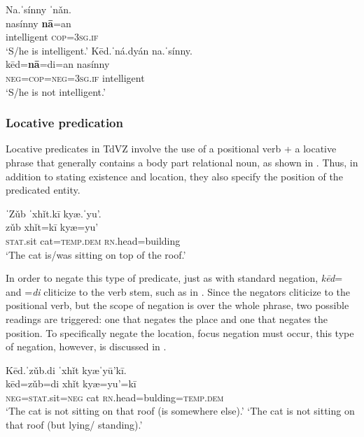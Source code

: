 \documentclass[output=paper,colorlinks=true, citecolor=brown]{langscibook}
\begin{document}
\ea\label{ex:zap:38}
    \ea\label{ex:zap:38a}
        \glll Na.ˈsínny ˈnǎn. \\ 
              nasínny \textbf{nā}=an \\
             intelligent \textsc{cop}=\textsc{3sg.if}\\
        \glt  ‘S/he is intelligent.’
    \ex\label{ex:zap:38b}
        \glll  Kēd.ˈná.dyán na.ˈsínny.\\
               kēd=\textbf{nā}=di=an nasínny\\ 
               \textsc{neg}=\textsc{cop}=\textsc{neg}=\textsc{3sg.if} intelligent\\
        \glt  ‘S/he is not intelligent.’
    \z
\z 

\subsubsection{Locative predication}\label{sec:zap:2.3.2}

Locative predicates in TdVZ involve the use of a positional verb + a locative phrase that generally contains a body part relational noun, as shown in . Thus, in addition to stating existence and location, they also specify the position of the predicated entity. 

\ea\label{ex:zap:39} 
    \glll ˈZǔb ˈxhǐt.kī kyæ.ˈyu’.\\ 
           zǔb xhǐt=kī kyæ=yu’\\
         \textsc{stat.}sit cat=\textsc{temp.dem} \textsc{rn}.head=building \\
    \glt  ‘The cat is/was sitting on top of the roof.’
\z 

In order to negate this type of predicate, just as with standard negation, \textit{kēd}= and =\textit{di} cliticize to the verb stem, such as in . Since the negators cliticize to the positional verb, but the scope of negation is over the whole phrase, two possible readings are triggered: one that negates the place and one that negates the position. To specifically negate the location, focus negation must occur, this type of negation, however, is discussed in .

\ea\label{ex:zap:40} 
    \glll Kēd.ˈzǔb.di ˈxhǐt kyæˈyū’kī.\\ 
          kēd=zǔb=di xhǐt kyæ=yu’=kī\\
          \textsc{neg}=\textsc{stat.}sit=\textsc{neg} cat \textsc{rn}.head=bulding=\textsc{temp.dem}\\
    \glt  ‘The cat is not sitting on that roof (is somewhere else).’
    \glt ‘The cat is not sitting on that roof (but lying/ standing).’
\z 
\end{document}
